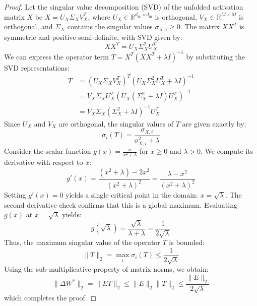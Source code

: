 \documentclass{article}
\theoremstyle{plain}
\theoremstyle{definition}
\theoremstyle{remark}
\begin{document}
\begin{proof}
Let the singular value decomposition (SVD) of the unfolded activation matrix $X$ be $X = U_X \Sigma_X V_X^T$, where $U_X \in \mathbb{R}^{d_{\text{in}} \times d_{\text{in}}}$ is orthogonal, $V_X \in \mathbb{R}^{M \times M}$ is orthogonal, and $\Sigma_X$ contains the singular values $\sigma_{X, i} \ge 0$.
The matrix $X X^T$ is symmetric and positive semi-definite, with SVD given by:
\begin{equation}
    X X^T = U_X \Sigma_X^2 U_X^T
\end{equation}
We can express the operator term $T = X^T (X X^T + \lambda I)^{-1}$ by substituting the SVD representations:
\begin{align}
    T &= (U_X \Sigma_X V_X^T)^T (U_X \Sigma_X^2 U_X^T + \lambda I)^{-1} \nonumber \\
      &= V_X \Sigma_X U_X^T \left( U_X ( \Sigma_X^2 + \lambda I ) U_X^T \right)^{-1} \nonumber \\
      &= V_X \Sigma_X (\Sigma_X^2 + \lambda I)^{-1} U_X^T
\end{align}
Since $U_X$ and $V_X$ are orthogonal, the singular values of $T$ are given exactly by:
\begin{equation}
    \sigma_i(T) = \frac{\sigma_{X, i}}{\sigma_{X, i}^2 + \lambda}
\end{equation}
Consider the scalar function $g(x) = \frac{x}{x^2 + \lambda}$ for $x \ge 0$ and $\lambda > 0$. We compute its derivative with respect to $x$:
\begin{equation}
    g'(x) = \frac{(x^2 + \lambda) - 2x^2}{(x^2 + \lambda)^2} = \frac{\lambda - x^2}{(x^2 + \lambda)^2}
\end{equation}
Setting $g'(x) = 0$ yields a single critical point in the domain: $x = \sqrt{\lambda}$. The second derivative check confirms that this is a global maximum. Evaluating $g(x)$ at $x = \sqrt{\lambda}$ yields:
\begin{equation}
    g(\sqrt{\lambda}) = \frac{\sqrt{\lambda}}{\lambda + \lambda} = \frac{1}{2\sqrt{\lambda}}
\end{equation}
Thus, the maximum singular value of the operator $T$ is bounded:
\begin{equation}
    \|T\|_2 = \max_i \sigma_i(T) \le \frac{1}{2\sqrt{\lambda}}
\end{equation}
Using the sub-multiplicative property of matrix norms, we obtain:
\begin{equation}
    \|\Delta W^*\|_2 = \|E T\|_2 \le \|E\|_2 \|T\|_2 \le \frac{\|E\|_2}{2\sqrt{\lambda}}
\end{equation}
which completes the proof.
\end{proof}
\end{document}
